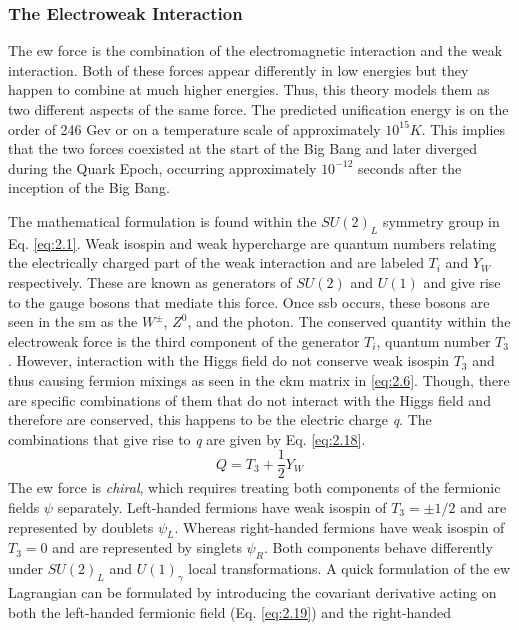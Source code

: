 \subsubsection{The Electroweak Interaction}

The \gls{ew} force is the combination of the electromagnetic interaction and the weak interaction.
Both of these forces appear differently in low energies but they happen to combine at much higher
energies. Thus, this theory models them as two different aspects of the same force. The predicted 
unification energy is on the order of 246 Gev or on a temperature scale of approximately $10^{15} K$. 
This implies that the two forces coexisted at the start of the Big Bang and later diverged during 
the Quark Epoch, occurring approximately $10^{-12}$ seconds after the inception of the Big Bang.
\par
The mathematical formulation is found within the $SU(2)_{L}$ symmetry group in Eq. \ref{eq:2.1}. 
Weak isospin and weak hypercharge are quantum numbers relating the electrically charged part of the weak interaction and are 
labeled $T_{\textit{i}}$ and $Y_{W}$ respectively. These are known as generators of $SU(2)$ and $U(1)$ and give rise to the gauge
bosons that mediate this force. Once \gls{ssb} occurs, these bosons are seen in the \gls{sm} as the $W^{\pm}$, 
$Z^{0}$, and the photon. The conserved quantity within the electroweak force is the third component of the generator 
$T_{\textit{i}}$, quantum number $T_{3}$. However, interaction with the Higgs field do not conserve weak isospin $T_{3}$
and thus causing fermion mixings as seen in the \gls{ckm} matrix in \ref{eq:2.6}. Though, there are specific combinations
of them that do not interact with the Higgs field and therefore are conserved, this happens to be the electric charge \textit{q}.
The combinations that give rise to \textit{q} are given by Eq. \ref{eq:2.18}.
%
\begin{equation}\label{eq:2.18}
    Q = T_{3} + \frac{1}2Y_{W}
\tag{2.18}
\end{equation}
%
The \gls{ew} force is \textit{chiral}, which requires treating both components of the fermionic fields $\psi$ separately.
Left-handed fermions have weak isospin of $T_{3}=\pm 1/2$ and are represented by doublets $\psi_{L}$. Whereas right-handed
fermions have weak isospin of $T_{3} = 0$ and are represented by singlets $\psi_{R}$. Both components behave differently under
$SU(2)_{L}$ and $U(1)_{\gamma}$ local transformations. A quick formulation of the \gls{ew} Lagrangian can be formulated
by introducing the covariant derivative acting on both the left-handed fermionic field (Eq. \ref{eq:2.19}) and the right-handed

